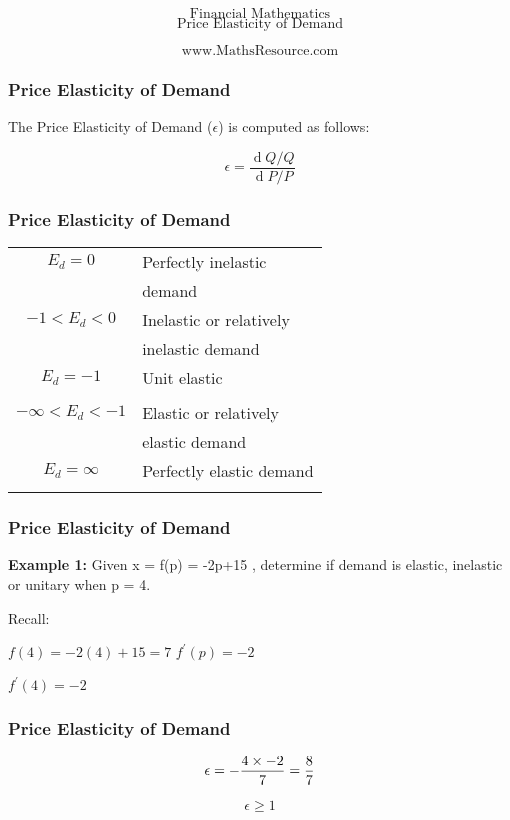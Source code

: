 \documentclass{beamer}
\begin{document}
\begin{frame}
\Huge
\[\mbox{Financial Mathematics}\]
\LARGE
\[\mbox{Price Elasticity of Demand}\]

\Large
\[\mbox{www.MathsResource.com}\]
\end{frame}

\begin{frame}
\frametitle{Price Elasticity of Demand}
\Large
The Price Elasticity of Demand ($\epsilon$) is computed as follows:

{
	\LARGE
\[ \epsilon = \frac{\operatorname d Q/Q}{\operatorname d P/P} \]
}
\end{frame}

\begin{frame}
\frametitle{Price Elasticity of Demand}
\Large
\begin{center}
\begin{tabular}{|c|l|} \hline
$E_d = 0$ & Perfectly inelastic  \\ & demand \\ \hline
$- 1 < E_d < 0 $ & Inelastic or relatively \\ 

& inelastic demand\\ \hline
$E_d=  - 1 $ & Unit elastic\\

 & \\  \hline
$ - \infty < E_d < - 1$ & 
Elastic or relatively\\  & elastic demand \\ \hline 
$E_d = \infty $&
Perfectly elastic demand \\ 

&  \\  \hline
\end{tabular} 
\end{center}
\end{frame}
\begin{frame}
\frametitle{Price Elasticity of Demand}
\Large


\textbf{Example 1:} Given x  = f(p) = -2p+15 , determine if demand is elastic, inelastic or unitary 
when p = 4.

Recall: 

$f(4) = -2(4) + 15 = 7$
$f^{\prime}(p) = -2$

$f^{\prime}(4) = -2$


\end{frame}
\begin{frame}
	\frametitle{Price Elasticity of Demand}
	\Large
\[ \epsilon = -\frac{4 \times -2}{7} = {8 \over 7} \]


\[ \epsilon \geq 1 \]
\end{frame}
\end{document}
